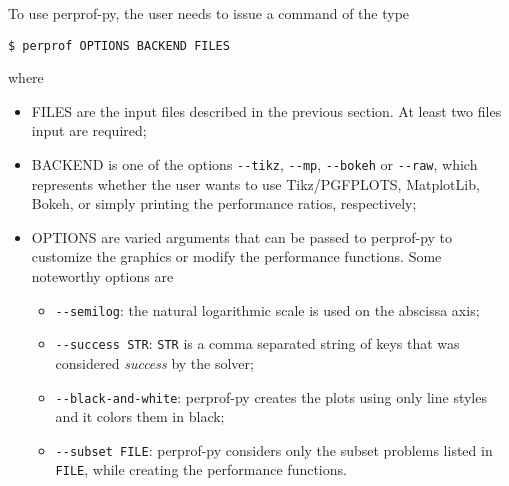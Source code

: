     To use perprof-py, the user needs to issue a command of the type
\begin{verbatim}
$ perprof OPTIONS BACKEND FILES
\end{verbatim}
    where
    \begin{itemize}
      \item FILES are the input files described in the previous section. At
        least two files input are required;
      \item BACKEND is one of the options \verb+--tikz+, \verb+--mp+,
        \verb+--bokeh+ or
        \verb+--raw+, which represents whether the user wants to use
        Tikz/PGFPLOTS, MatplotLib, Bokeh, or simply printing the performance
        ratios, respectively;
      \item OPTIONS are varied arguments that can be passed to perprof-py to
        customize the graphics or modify the performance functions. Some
        noteworthy options are
        \begin{itemize}
          \item \verb+--semilog+: the natural logarithmic scale is used on the
          abscissa axis;
          \item \verb+--success STR+: \verb+STR+ is a comma separated string
            of keys that was considered  \emph{success} by the solver;
          \item \verb+--black-and-white+: perprof-py creates the plots using
            only line styles and it colors them in black;
          \item \verb+--subset FILE+: perprof-py considers only the subset problems listed in \verb+FILE+, while creating the performance functions.
        \end{itemize}
    \end{itemize}

